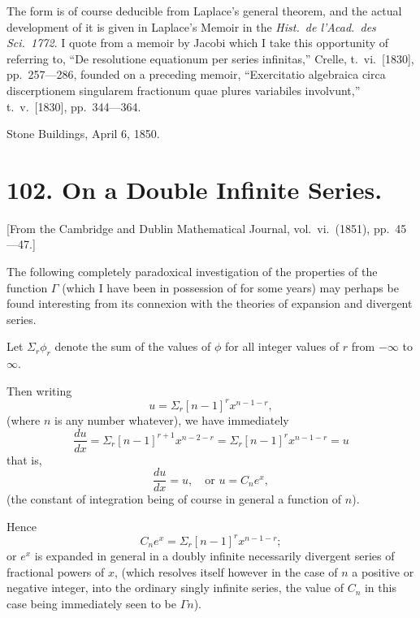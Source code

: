 \documentclass[11pt,a4paper]{article}
\theoremstyle{plain}
\begin{document}
The form is of course deducible from Laplace's general theorem, and the actual development of it is given in Laplace's Memoir in the \textit{Hist.\ de l'Acad.\ des Sci.\ 1772}. I quote from a memoir by Jacobi which I take this opportunity of referring to, ``De resolutione equationum per series infinitas,'' Crelle, t.\ vi.\ [1830], pp.\ 257---286, founded on a preceding memoir, ``Exercitatio algebraica circa discerptionem singularem fractionum quae plures variabiles involvunt,'' t.\ v.\ [1830], pp.\ 344---364.

\begin{flushright}
Stone Buildings, April 6, 1850.
\end{flushright}
\clearpage


\section*{102. On a Double Infinite Series.}

[From the Cambridge and Dublin Mathematical Journal, vol.\ vi.\ (1851), pp.\ 45---47.]

The following completely paradoxical investigation of the properties of the function $\Gamma$ (which I have been in possession of for some years) may perhaps be found interesting from its connexion with the theories of expansion and divergent series.

Let $\Sigma_r \phi_r$ denote the sum of the values of $\phi$ for all integer values of $r$ from $-\infty$ to $\infty$.

Then writing
\begin{equation}
u = \Sigma_r [n-1]^r x^{n-1-r},\tag{1}\end{equation}
(where $n$ is any number whatever), we have immediately
\[\frac{du}{dx} = \Sigma_r [n-1]^{r+1} x^{n-2-r} = \Sigma_r [n-1]^r x^{n-1-r} = u\]
that is,
\[\frac{du}{dx} = u, \quad \text{or } u = C_n e^x,\]
(the constant of integration being of course in general a function of $n$).

Hence
\begin{equation}C_n e^x = \Sigma_r [n-1]^r x^{n-1-r};\tag{2}\end{equation}
or $e^x$ is expanded in general in a doubly infinite necessarily divergent series of fractional powers of $x$, (which resolves itself however in the case of $n$ a positive or negative integer, into the ordinary singly infinite series, the value of $C_n$ in this case being immediately seen to be $\Gamma n$).
\end{document}
